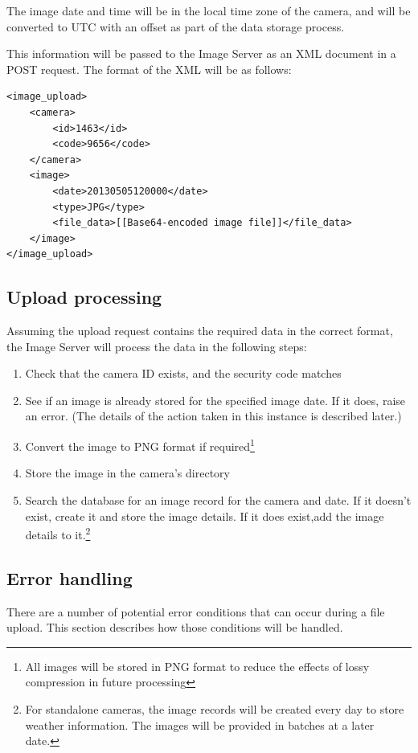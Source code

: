 \documentclass[11pt]{article}
\begin{document}
The image date and time will be in the local time zone of the camera, and will be converted to UTC with an offset as part of the data storage process.

This information will be passed to the Image Server as an XML document in a POST request. The format of the XML will be as follows:

\begin{verbatim}
<image_upload>
    <camera>
        <id>1463</id>
        <code>9656</code>
    </camera>
    <image>
        <date>20130505120000</date>
        <type>JPG</type>
        <file_data>[[Base64-encoded image file]]</file_data>
    </image>
</image_upload>
\end{verbatim}


\subsection{Upload processing}
Assuming the upload request contains the required data in the correct format, the Image Server will process the data in the following steps:

\begin{enumerate}
\item Check that the camera ID exists, and the security code matches
\item See if an image is already stored for the specified image date. If it does, raise an error. (The details of the action taken in this instance is described later.)
\item Convert the image to PNG format if required\footnote{All images will be stored in PNG format to reduce the effects of lossy compression in future processing}
\item Store the image in the camera's directory
\item Search the database for an image record for the camera and date. If it doesn't exist, create it and store the image details. If it does exist,add the image details to it.\footnote{For standalone cameras, the image records will be created every day to store weather information. The images will be provided in batches at a later date.}
\end{enumerate}

\subsection{Error handling}
There are a number of potential error conditions that can occur during a file upload. This section describes how those conditions will be handled.
\end{document}
